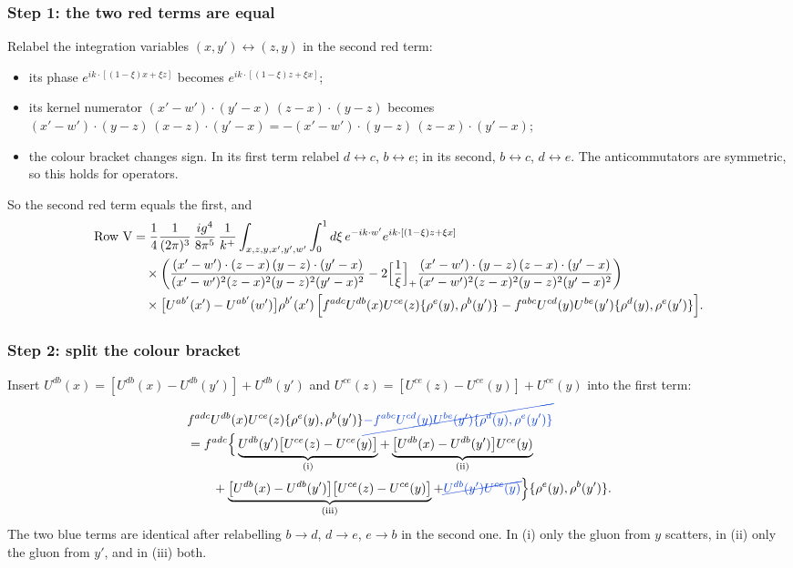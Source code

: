 \documentclass[9pt]{article}
\newcommand{\R}[1]{{\color{cR}#1}}
\newcommand{\B}[1]{{\color{cB}#1}}
\numberwithin{equation}{section}
\begin{document}
\subsubsection*{Step 1: the two \R{red} terms are equal}
Relabel the integration variables $(x,y')\leftrightarrow(z,y)$ in the second red term:
\begin{itemize}
\item its phase $e^{ik\cdot[(1-\xi)x+\xi z]}$ becomes $e^{ik\cdot[(1-\xi)z+\xi x]}$;
\item its kernel numerator $(x'-w')\cdot(y'-x)\,(z-x)\cdot(y-z)$ becomes $(x'-w')\cdot(y-z)\,(x-z)\cdot(y'-x)=-(x'-w')\cdot(y-z)\,(z-x)\cdot(y'-x)$;
\item the colour bracket changes sign. In its first term relabel $d\leftrightarrow c$, $b\leftrightarrow e$; in its second, $b\leftrightarrow c$, $d\leftrightarrow e$. The anticommutators are symmetric, so this holds for operators.
\end{itemize}
So the second red term equals the first, and
\begin{align}
\text{Row V}&=\frac14\frac{1}{(2\pi)^{3}}\,\frac{ig^{4}}{8\pi^{5}}\,\frac{1}{k^{+}}\int_{x,z,y,x',y',w'}\int_{0}^{1}d\xi\,e^{-ik\cdot w'}e^{ik\cdot[(1-\xi)z+\xi x]}\notag\\
&\quad\times\bigg(\frac{(x'-w')\cdot(z-x)\,(y-z)\cdot(y'-x)}{(x'-w')^{2}(z-x)^{2}(y-z)^{2}(y'-x)^{2}}-2\Big[\frac1\xi\Big]_{+}\frac{(x'-w')\cdot(y-z)\,(z-x)\cdot(y'-x)}{(x'-w')^{2}(z-x)^{2}(y-z)^{2}(y'-x)^{2}}\bigg)\notag\\
&\quad\times\big[U^{ab'}(x')-U^{ab'}(w')\big]\rho^{b'}(x')\,\Big[f^{adc}U^{db}(x)U^{ce}(z)\{\rho^{e}(y),\rho^{b}(y')\}-f^{abc}U^{cd}(y)U^{be}(y')\{\rho^{d}(y),\rho^{e}(y')\}\Big].
\end{align}

\subsubsection*{Step 2: split the colour bracket}
Insert $U^{db}(x)=[U^{db}(x)-U^{db}(y')]+U^{db}(y')$ and $U^{ce}(z)=[U^{ce}(z)-U^{ce}(y)]+U^{ce}(y)$ into the first term:
\begin{align}
&f^{adc}U^{db}(x)U^{ce}(z)\{\rho^{e}(y),\rho^{b}(y')\}\B{\cancel{-f^{abc}U^{cd}(y)U^{be}(y')\{\rho^{d}(y),\rho^{e}(y')\}}}\notag\\
&=f^{adc}\Big\{\underbrace{U^{db}(y')\big[U^{ce}(z)-U^{ce}(y)\big]}_{\rm(i)}+\underbrace{\big[U^{db}(x)-U^{db}(y')\big]U^{ce}(y)}_{\rm(ii)}\notag\\
&\qquad+\underbrace{\big[U^{db}(x)-U^{db}(y')\big]\big[U^{ce}(z)-U^{ce}(y)\big]}_{\rm(iii)}+\B{\cancel{U^{db}(y')U^{ce}(y)}}\Big\}\{\rho^{e}(y),\rho^{b}(y')\}.
\end{align}
The two \B{blue} terms are identical after relabelling $b\to d$, $d\to e$, $e\to b$ in the second one. In (i) only the gluon from $y$ scatters, in (ii) only the gluon from $y'$, and in (iii) both.
\end{document}
